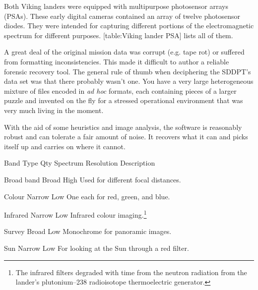
Both Viking landers were equipped with multipurpose photosensor arrays (PSAs). These early digital cameras contained an array of twelve photosensor diodes. They were intended for capturing different portions of the electromagnetic spectrum for different purposes. [table:Viking lander PSA] lists all of them.

A great deal of the original mission data was corrupt (e.g. tape rot) or suffered from formatting inconsistencies. This made it difficult to author a reliable forensic recovery tool. The general rule of thumb when deciphering the SDDPT's data set was that there probably wasn't one. You have a very large heterogeneous mixture of files encoded in {\it ad hoc} formats, each containing pieces of a larger puzzle and invented on the fly for a stressed operational environment that was very much living in the moment. 

With the aid of some heuristics and image analysis, the software is reasonably robust and can tolerate a fair amount of noise. It recovers what it can and picks itself up and carries on where it cannot.

{
    \bTABLE[split=repeat,option=stretch]
    \setupTABLE[column][5]
        [width=.43\textwidth,
        align=yes]
    \setupTABLE[row][each][align=center]
    \setupTABLE[4][1][align=center]

\bTABLEhead
    \bTR[bottomframe=on]
      \bTH  Band Type \eTH
      \bTH  Qty \eTH
      \bTH  Spectrum \eTH
      \bTH  Resolution \eTH
      \bTH  Description \eTH
    \eTR
\eTABLEhead

\bTABLEbody
    \bTR
      \bTC Broad band \eTC
       \eTC
      \bTC Broad \eTC
      \bTC High \eTC
      \bTC Used for different focal distances. \eTC
    \eTR

    \bTR
      \bTC Colour \eTC
       \eTC
      \bTC Narrow \eTC
      \bTC Low \eTC
      \bTC One each for red, green, and blue. \eTC
    \eTR

    \bTR
      \bTC Infrared \eTC
       \eTC
      \bTC Narrow \eTC
      \bTC Low \eTC
      \bTC Infrared colour imaging.\footnote{The infrared filters degraded with time from the neutron radiation from the lander's plutonium--238 radioisotope thermoelectric generator.} \eTC
    \eTR

    \bTR
      \bTC Survey \eTC
       \eTC
      \bTC Broad \eTC
      \bTC Low \eTC
      \bTC Monochrome for panoramic images. \eTC
    \eTR
    
    \bTR
      \bTC Sun \eTC
       \eTC
      \bTC Narrow \eTC
      \bTC Low \eTC
      \bTC For looking at the Sun through a red filter. \eTC
    \eTR

\eTABLEbody

\eTABLE
}

